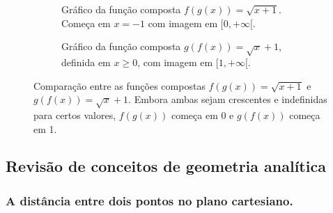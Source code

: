 \documentclass[12pt,openright,twoside,a4paper]{article}
\theoremstyle{definition}
\begin{document}
	\begin{figure}[h]
		\centering
		\begin{subfigure}[t]{0.48\textwidth}
			\centering
			\caption{Gráfico da função composta \( f(g(x)) = \sqrt{x + 1} \). Começa em \( x = -1 \) com imagem em \( [0, +\infty[ \).}
			\label{fig:fgx}
		\end{subfigure}
		\hfill
		\begin{subfigure}[t]{0.48\textwidth}
			\centering
			\caption{Gráfico da função composta \( g(f(x)) = \sqrt{x} + 1 \), definida em \( x \geq 0 \), com imagem em \( [1, +\infty[ \).}
			\label{fig:gfx}
		\end{subfigure}
		
		\caption{Comparação entre as funções compostas \( f(g(x)) = \sqrt{x + 1} \) e \( g(f(x)) = \sqrt{x} + 1 \). Embora ambas sejam crescentes e indefinidas para certos valores, \( f(g(x)) \) começa em 0 e \( g(f(x)) \) começa em 1.}
		\label{fig:comparacao-funcao-composta}
	\end{figure}
	
	
	\subsection{Revisão de conceitos de geometria analítica}
	
	\subsubsection{A distância entre dois pontos no plano cartesiano.}
	
\end{document}
